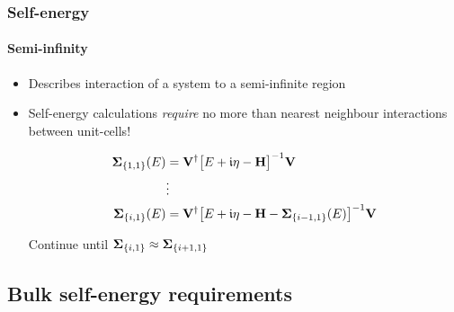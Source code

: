 \begin{frame}
  \frametitle{Self-energy}
  \framesubtitle{Semi-infinity}

  \begin{itemize}
    \item%
    Describes interaction of a system to a semi-infinite region
    
    \item%
    Self-energy calculations \emph{require} no more than nearest neighbour interactions between unit-cells!

    \begin{align*}
      \SE_{\mrc 11}(E) &= \VV^\dagger\big[E+\im\eta-\HH\big]^{-1}\VV
      \\
      &\vdots
      \\
      \SE_{\mrc i1}(E) &= \VV^\dagger\big[E+\im\eta-\HH-\SE_{\mrc{i-1}1}(E)\big]^{-1}\VV
    \end{align*}

    Continue until $\SE_{\mrc i1}\approx\SE_{\mrc{i+1}1}$

    \begin{center}
    \end{center}

  \end{itemize}
  
\end{frame}


\subsection{Bulk self-energy requirements}

